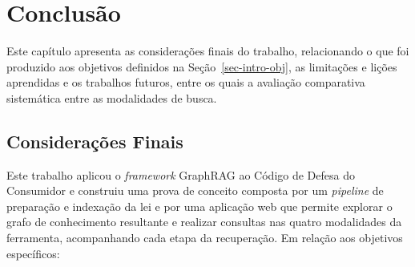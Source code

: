 \chapter{Conclusão}
\label{sec-conclusoes}

Este capítulo apresenta as considerações finais do trabalho, relacionando o que foi produzido aos objetivos definidos na Seção~\ref{sec-intro-obj}, as limitações e lições aprendidas e os trabalhos futuros, entre os quais a avaliação comparativa sistemática entre as modalidades de busca.

\section{Considerações Finais}
\label{sec-conclusoes-consideracoes}

Este trabalho aplicou o \textit{framework} GraphRAG ao Código de Defesa do Consumidor e construiu uma prova de conceito composta por um \textit{pipeline} de preparação e indexação da lei e por uma aplicação web que permite explorar o grafo de conhecimento resultante e realizar consultas nas quatro modalidades da ferramenta, acompanhando cada etapa da recuperação. Em relação aos objetivos específicos:

